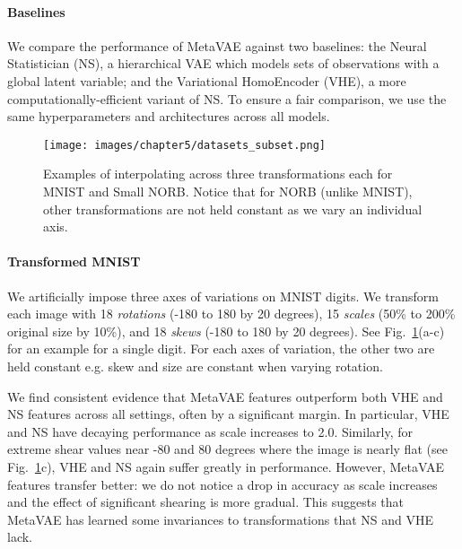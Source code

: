 \paragraph{Baselines} We compare the performance of MetaVAE against two baselines: the Neural Statistician (NS), a hierarchical VAE which models sets of observations with a global latent variable; and the Variational HomoEncoder (VHE), a more computationally-efficient variant of  NS. To ensure a fair comparison, we use the same hyperparameters and architectures across all models.

\begin{figure}
    \centering
    \texttt{[image: images/chapter5/datasets\_subset.png]}
    \caption{Examples of interpolating across three transformations each for MNIST and Small NORB. Notice that for NORB (unlike MNIST), other transformations are not held constant as we vary an individual axis.}
    \label{fig:datasets}
\end{figure}

\paragraph{Transformed MNIST}

We artificially impose three axes of variations on MNIST digits. We transform each image with 18 \textit{rotations} (-180 to 180 by 20 degrees), 15 \textit{scales} (50\% to 200\% original size by 10\%), and  18 \textit{skews} (-180 to 180 by 20 degrees). 
See Fig.~\ref{fig:datasets}(a-c) for an example for a single digit. For each axes of variation, the other two are held constant e.g. skew and size are constant when varying rotation. 

We find consistent evidence that MetaVAE features outperform both VHE and NS features across all settings, often by a significant margin. In particular, VHE and NS have decaying performance as scale increases to 2.0. Similarly, for extreme shear values near -80 and 80 degrees where the image is nearly flat (see Fig.~\ref{fig:datasets}c), VHE and NS again suffer greatly in performance.
However, MetaVAE features transfer better: we do not notice a drop in accuracy as scale increases and the effect of significant shearing is more gradual. 
This suggests that MetaVAE has learned some invariances to transformations that NS and VHE lack.

